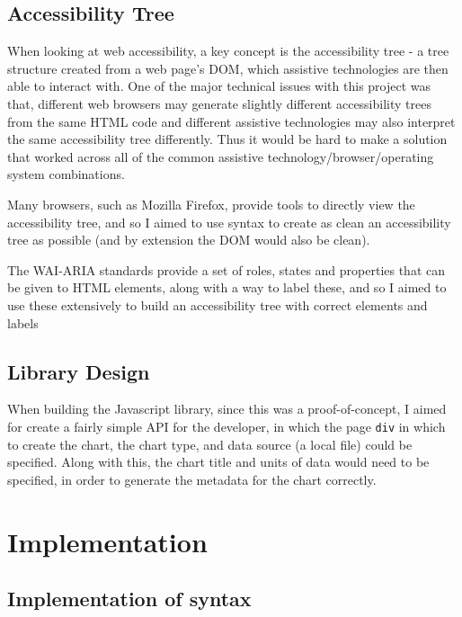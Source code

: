 \documentclass[ %
                    author={Aleena Baig},
                supervisor={Dr Simon Lock},
                    degree={BSc},
                     title={On Making Web Accessible Graphs},
                  subtitle={},
                      year={2019} ]{dissertation}
\begin{document}
\section{Accessibility Tree}

When looking at web accessibility, a key concept is the accessibility tree - a tree structure created from a web page's DOM, which assistive technologies are then able to interact with. One of the major technical issues with this project was that, different web browsers may generate slightly different accessibility trees from the same HTML code and different assistive technologies may also interpret the same accessibility tree differently. Thus it would be hard to make a solution that worked across all of the common assistive technology/browser/operating system combinations.


Many browsers, such as Mozilla Firefox, provide tools to directly view the accessibility tree, and so I aimed to use syntax to create as clean an accessibility tree as possible (and by extension the DOM would also be clean).

The WAI-ARIA standards provide a set of roles, states and properties that can be given to HTML elements, along with a way to label these, and so I aimed to use these extensively to build an accessibility tree with correct elements and labels

\section{Library Design}

When building the Javascript library, since this was a proof-of-concept, I aimed for create a fairly simple API for the developer, in which the page \texttt{div} in which to create the chart, the chart type, and data source (a local file) could be specified. Along with this, the chart title and units of data would need to be specified, in order to generate the metadata for the chart correctly.

\chapter{Implementation}

\section{Implementation of syntax}
\end{document}
